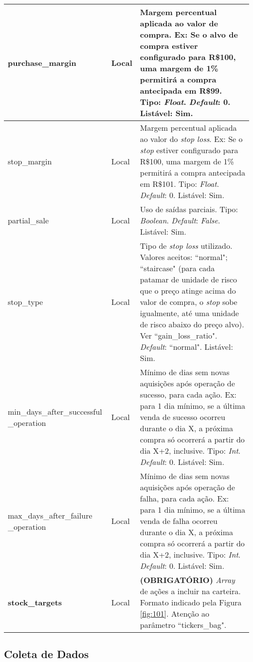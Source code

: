 \begin{center}
{\begin{longtable}[m]{| m{11em} | m{3em}| m{21em} |}
        purchase\_margin & Local & Margem percentual aplicada ao valor de compra. Ex: Se o alvo de compra estiver configurado para R\$100, uma margem de 1\% permitirá a compra antecipada em R\$99. Tipo: \textit{Float}. \textit{Default}: 0. Listável: Sim. \\
        \hline
        stop\_margin & Local & Margem percentual aplicada ao valor do \textit{stop loss}. Ex: Se o \textit{stop} estiver configurado para R\$100, uma margem de 1\% permitirá a compra antecipada em R\$101. Tipo: \textit{Float}. \textit{Default}: 0. Listável: Sim. \\
        \hline
        partial\_sale & Local & Uso de saídas parciais. Tipo: \textit{Boolean}. \textit{Default}: \textit{False}. Listável: Sim. \\
        \hline
        stop\_type & Local & Tipo de \textit{stop loss} utilizado. Valores aceitos: ``normal"; ``staircase" (para cada patamar de unidade de risco que o preço atinge acima do valor de compra, o \textit{stop} sobe igualmente, até uma unidade de risco abaixo do preço alvo). Ver ``gain\_loss\_ratio". \textit{Default}: ``normal". Listável: Sim. \\
        \hline
        min\_days\_after\_successful \_operation & Local & Mínimo de dias sem novas aquisições após operação de sucesso, para cada ação. Ex: para 1 dia mínimo, se a última venda de sucesso ocorreu durante o dia X, a próxima compra só ocorrerá a partir do dia X+2, inclusive. Tipo: \textit{Int}. \textit{Default}: 0. Listável: Sim. \\
        \hline
        max\_days\_after\_failure \_operation & Local & Mínimo de dias sem novas aquisições após operação de falha, para cada ação. Ex: para 1 dia mínimo, se a última venda de falha ocorreu durante o dia X, a próxima compra só ocorrerá a partir do dia X+2, inclusive. Tipo: \textit{Int}. \textit{Default}: 0. Listável: Sim. \\
        \hline

        \textbf{stock\_targets} & Local & \textbf{(OBRIGATÓRIO)} \textit{Array} de ações a incluir na carteira. Formato indicado pela Figura \ref{fig:101}. Atenção ao parâmetro ``tickers\_bag". \\
        \hline

    \end{longtable}}
\end{center}



\subsection{Coleta de Dados}

